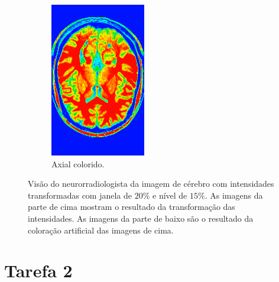 \documentclass{article}
\begin{document}
\begin{figure}[H]
\begin{subfigure}[b]{0.3\textwidth}
        \includegraphics[width=\textwidth]{brain/neuroradiologist-axial.png}
        \caption{Axial colorido.}
    \end{subfigure}
    \caption{Visão do neurorradiologista da imagem de cérebro com intensidades transformadas com janela de $20\%$ e nível de $15\%$. As imagens da parte de cima mostram o resultado da transformação das intensidades. As imagens da parte de baixo são o resultado da coloração artificial das imagens de cima.}
    \label{fig:brain-visao-neurorradiologista-cores}
\end{figure}

\section{Tarefa 2}
\end{document}
